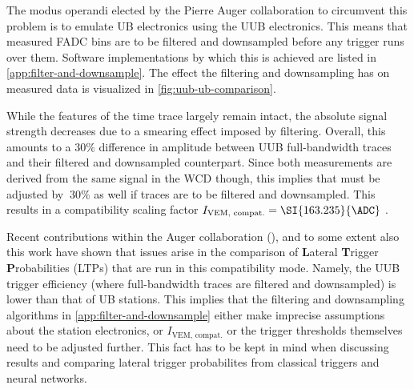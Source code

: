 The modus operandi elected by the Pierre Auger collaboration to circumvent this problem is to emulate UB electronics using the UUB electronics. This means that 
measured FADC bins are to be filtered and downsampled before any trigger runs over them. Software implementations by which this is achieved are listed in 
\autoref{app:filter-and-downsample}. The effect the filtering and downsampling has on measured data is visualized in \autoref{fig:uub-ub-comparison}.

While the features of the time trace largely remain intact, the absolute signal strength decreases due to a smearing effect imposed by filtering. Overall, this
amounts to a $30\%$ difference in amplitude between UUB full-bandwidth traces and their filtered and downsampled counterpart. Since both measurements are derived 
from the same signal in the WCD though, this implies that \Ipeak must be adjusted by $~30\%$ as well if traces are to be filtered and downsampled. This results in 
a compatibility scaling factor $I_\text{VEM, compat.} = \SI{163.235}{\ADC}$ \cite{OfflineSource}.

Recent contributions within the Auger collaboration (\cite{nitzTriggers, quentinComparison}), and to some extent also this work have shown that issues arise in the 
comparison of \textbf{L}ateral \textbf{T}rigger \textbf{P}robabilities (LTPs) that are run in this compatibility mode. Namely, the UUB trigger efficiency (where 
full-bandwidth traces are filtered and downsampled) is lower than that of UB stations. This implies that the filtering and downsampling algorithms in 
\autoref{app:filter-and-downsample} either make imprecise assumptions about the station electronics, or $I_\text{VEM, compat.}$ or the trigger thresholds 
themselves need to be adjusted further. This fact has to be kept in mind when discussing results and comparing lateral trigger probabilites from classical triggers
and neural networks. 

